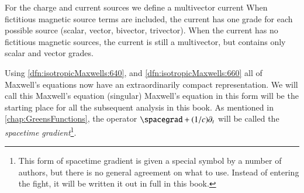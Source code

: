 For the charge and current sources we define a multivector current
When fictitious magnetic source terms are included, the current has one grade for each possible source (scalar, vector, bivector, trivector).  When the current has no fictitious magnetic sources, the current is still a multivector, but contains only scalar and vector grades.

Using \cref{dfn:isotropicMaxwells:640}, and \cref{dfn:isotropicMaxwells:660} all of Maxwell's equations
now have an extraordinarily compact representation.  We will call this Maxwell's equation (singular)
Maxwell's equation in this form will be the starting place for all the subsequent analysis in this book.
As mentioned in \cref{chap:GreensFunctions}, the operator \( \spacegrad + (1/c) \partial_t \) will be called the \textit{spacetime gradient}\footnote{This form of spacetime gradient is given a special symbol by a number of authors, but there is no general agreement on what to use.
Instead of entering the fight, it will be written it out in full in this book.}.
